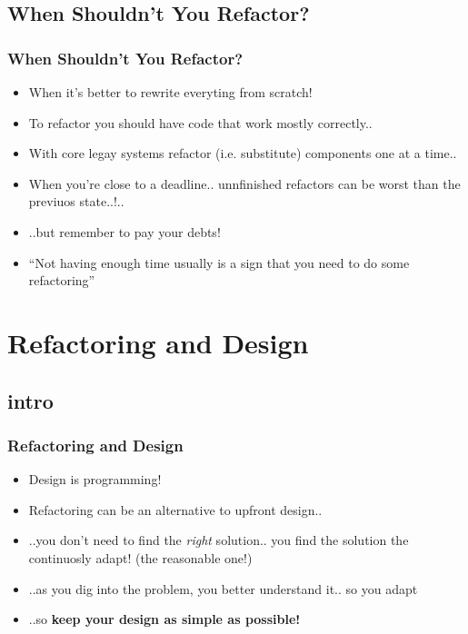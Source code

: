 \documentclass{beamer}
\begin{document}
\subsection{When Shouldn't You Refactor?}
\begin{frame}
  \frametitle{When Shouldn't You Refactor?} 
  \begin{itemize}
  		\item<+-> When it's better to rewrite everyting from scratch!
  		\item<+-> To refactor you should have code that work mostly correctly..
  		\item<+-> With core legay systems refactor (i.e. substitute) components one at a time..
  		\item<+-> When you're close to a deadline.. unnfinished refactors can be worst than the previuos state..!..
  		\item<+-> ..but remember to pay your debts!
  		\item<+-> ``Not having enough time usually is a sign that you need to do some refactoring''
  \end{itemize}
\end{frame}

\section{Refactoring and Design}
\subsection{intro}
\begin{frame}
  \frametitle{Refactoring and Design} 
  \begin{itemize}
  		\item<+-> Design is programming!
  		\item<+-> Refactoring can be an alternative to upfront design.. 
  		\item<+-> ..you don't need to find the \textit{right} solution.. you find the solution the continuosly adapt! (the reasonable one!)
  		\item<+-> ..as you dig into the problem, you better understand it.. so you adapt
  		\item<+-> ..so \textbf{keep your design as simple as possible!}
  \end{itemize}
\end{frame}  
  
\end{document}
